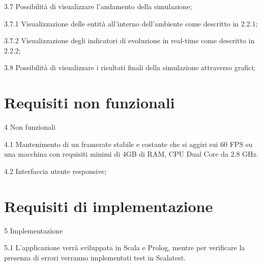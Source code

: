 \begin{myEnumerate}
\begin{myEnumerate}[label*=\arabic*.]
	\item[3.7] Possibilità di visualizzare l'andamento della simulazione;	
	\begin{myEnumerate}[label*=\arabic*.]
		\item[3.7.1] Visualizzazione delle entità all'interno dell'ambiente come descritto in 2.2.1;
		\item[3.7.2] Visualizzazione degli indicatori di evoluzione in real-time come descritto in 2.2.2;
	\end{myEnumerate}
	\item[3.8] Possibilità di visualizzare i risultati finali della simulazione attraverso grafici;
	\end{myEnumerate}
\end{myEnumerate}

\section{Requisiti non funzionali}

\begin{myEnumerate}[label*=\arabic*.]
	\item[4] Non funzionali
	\begin{myEnumerate}[label*=\arabic*.]
		\item[4.1] Mantenimento di un framerate stabile e costante che si aggiri sui 60 FPS su una macchina con requisiti minimi di 4GB di RAM, CPU Dual Core da 2.8 GHz.
		\item[4.2] Interfaccia utente responsive;
	\end{myEnumerate}
\end{myEnumerate}


\section{Requisiti di implementazione}

\begin{myEnumerate}[label*=\arabic*.]
	\item[5] Implementazione
	\begin{myEnumerate}[label*=\arabic*.]
		\item[5.1] L'applicazione verrà sviluppata in Scala e Prolog, mentre per verificare la presenza di errori verranno implementati test in Scalatest.
	\end{myEnumerate}
\end{myEnumerate}